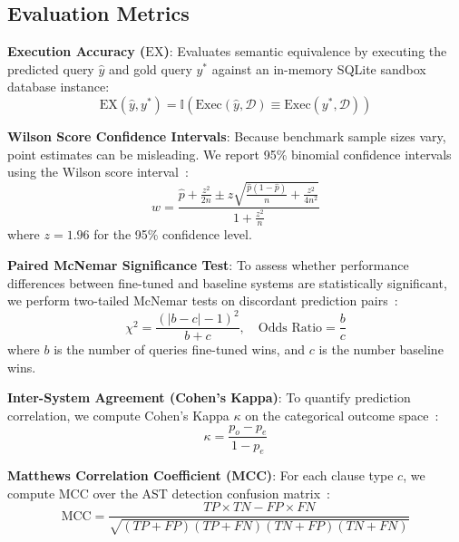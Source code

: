 \documentclass[10pt,twocolumn,letterpaper]{article}
\theoremstyle{definition}
\begin{document}
\subsection{Evaluation Metrics}
\noindent\textbf{Execution Accuracy ($\text{EX}$)}: Evaluates semantic equivalence by executing the predicted query $\hat{y}$ and gold query $y^*$ against an in-memory SQLite sandbox database instance:
\begin{equation}
    \text{EX}(\hat{y}, y^*) = \mathbb{I}\left(\text{Exec}(\hat{y}, \mathcal{D}) \equiv \text{Exec}(y^*, \mathcal{D})\right)
\end{equation}

\noindent\textbf{Wilson Score Confidence Intervals}: Because benchmark sample sizes vary, point estimates can be misleading. We report 95\% binomial confidence intervals using the Wilson score interval~\cite{wilson1927probable}:
\begin{equation}
    w = \frac{\hat{p} + \frac{z^2}{2n} \pm z \sqrt{\frac{\hat{p}(1-\hat{p})}{n} + \frac{z^2}{4n^2}}}{1 + \frac{z^2}{n}}
\end{equation}
where $z = 1.96$ for the 95\% confidence level.

\noindent\textbf{Paired McNemar Significance Test}: To assess whether performance differences between fine-tuned and baseline systems are statistically significant, we perform two-tailed McNemar tests on discordant prediction pairs~\cite{mcnemar1947note}:
\begin{equation}
    \chi^2 = \frac{(|b - c| - 1)^2}{b + c}, \quad \text{Odds Ratio} = \frac{b}{c}
\end{equation}
where $b$ is the number of queries fine-tuned wins, and $c$ is the number baseline wins.

\noindent\textbf{Inter-System Agreement (Cohen's Kappa)}: To quantify prediction correlation, we compute Cohen's Kappa $\kappa$ on the categorical outcome space~\cite{cohen1960coefficient}:
\begin{equation}
    \kappa = \frac{p_o - p_e}{1 - p_e}
\end{equation}

\noindent\textbf{Matthews Correlation Coefficient (MCC)}: For each clause type $c$, we compute MCC over the AST detection confusion matrix~\cite{matthews1975comparison}:
\begin{equation}
    \text{MCC} = \frac{TP \times TN - FP \times FN}{\sqrt{(TP+FP)(TP+FN)(TN+FP)(TN+FN)}}
\end{equation}

\end{document}

